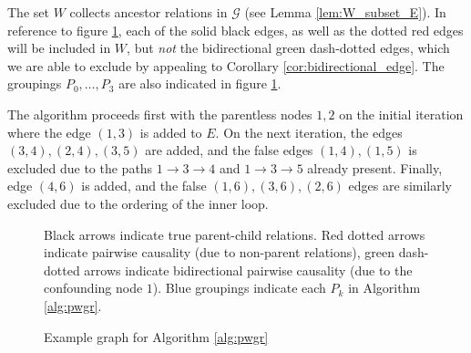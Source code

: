 \documentclass[12pt]{article}
\def\gcg{\mathcal{G}}  %
\begin{document}
\begin{example}
  The set $W$ collects ancestor relations in $\gcg$ (see Lemma
  \ref{lem:W_subset_E}).  In reference to figure
  \ref{fig:example_fig3}, each of the solid black edges, as well as
  the dotted red edges will be included in $W$, but \textit{not} the
  bidirectional green dash-dotted edges, which we are able to exclude
  by appealing to Corollary \ref{cor:bidirectional_edge}.  The
  groupings $P_0, \ldots, P_3$ are also indicated in figure
  \ref{fig:example_fig3}.

  The algorithm proceeds first with the parentless nodes $1, 2$ on the
  initial iteration where the edge $(1, 3)$ is added to $E$.  On the
  next iteration, the edges $(3, 4), (2, 4), (3, 5)$ are added, and
  the false edges $(1, 4), (1, 5)$ is excluded due to the paths
  $1 \rightarrow 3 \rightarrow 4$ and $1 \rightarrow 3 \rightarrow 5$
  already present.  Finally, edge $(4, 6)$ is added, and the false
  $(1, 6), (3, 6), (2, 6)$ edges are similarly excluded due to the
  ordering of the inner loop.
  
  \begin{figure}
    \centering
    \caption{Example graph for Algorithm \ref{alg:pwgr}}
    \footnotesize{Black arrows indicate true parent-child
      relations.  Red dotted arrows indicate pairwise causality (due to
      non-parent relations), green dash-dotted arrows indicate
      bidirectional pairwise causality (due to the confounding node
      $1$).  Blue groupings indicate each $P_k$ in Algorithm
      \ref{alg:pwgr}.}
    \label{fig:example_fig3}
    

\end{figure}
\end{example}
\end{document}
